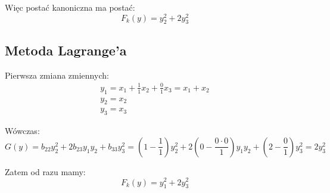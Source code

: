 \documentclass{article}
\begin{document}
Więc postać kanoniczna ma postać:
$$
    F_{k}(y) = y_{2}^{2} + 2y_{3}^{2} 
$$

\subsection{Metoda Lagrange'a}
Pierwsza zmiana zmiennych:
$$
    \begin{array}{l}
         y_{1} = x_{1} + \frac{1}{1}x_{2} + \frac{0}{1}x_{3} = x_{1} + x_{2}\\
         y_{2} = x_{2}\\
         y_{3} = x_{3}
    \end{array}
$$

Wówczas:
$$
    G(y) = b_{22}y_{2}^{2} + 2b_{23}y_{1}y_{2} + b_{33}y_{3}^{2} = (1 - \frac{1}{1})y_{2}^{2} + 2(0 - \frac{0 \cdot 0}{1})y_{1}y_{2} + (2 - \frac{0}{1})y_{3}^{2} = 2y_{3}^{2}
$$

Zatem od razu mamy:
$$
    F_{k}(y) = y_{1}^{2} + 2y_{3}^{2} 
$$
\end{document}
